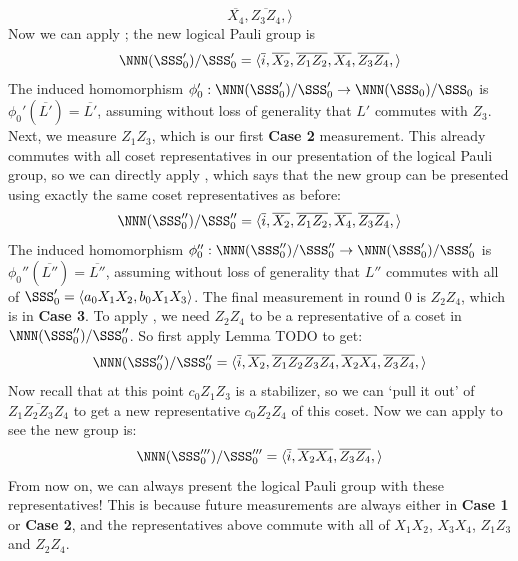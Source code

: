 \begin{example}
\begin{equation}
            \overline{X_4}, \overline{Z_3 Z_4},
        \rangle
    \end{equation}
    Now we can apply ; the new logical Pauli group is
    \begin{equation}
        \NNN(\SSS_{0}')/\SSS_{0}' = \langle
            \overline{i},
            \overline{X_2}, \overline{Z_1 Z_2},
            \overline{X_4}, \overline{Z_3 Z_4},
        \rangle
    \end{equation}
    The induced homomorphism $\phi_0': \NNN(\SSS_{0}')/\SSS_{0}' \to \NNN(\SSS_{0})/\SSS_{0}$ is $\phi_0'(\overline{L'}) = \overline{L'}$, assuming without loss of generality that $L'$ commutes with $Z_3$.
    Next, we measure $Z_1 Z_3$, which is our first \textbf{Case 2} measurement.
    This already commutes with all coset representatives in our presentation of the logical Pauli group, so we can directly apply , which says that the new group can be presented using exactly the same coset representatives as before:
    \begin{equation}
        \NNN(\SSS_{0}'')/\SSS_{0}'' = \langle
        \overline{i},
        \overline{X_2}, \overline{Z_1 Z_2},
        \overline{X_4}, \overline{Z_3 Z_4},
        \rangle
    \end{equation}
    The induced homomorphism $\phi_0'': \NNN(\SSS_{0}'')/\SSS_{0}'' \to \NNN(\SSS_{0}')/\SSS_{0}'$ is $\phi_0''(\overline{L''}) = \overline{L''}$, assuming without loss of generality that $L''$ commutes with all of $\SSS_{0}' = \langle a_0 X_1 X_2, b_0 X_1 X_3 \rangle$.
    The final measurement in round $0$ is $Z_2 Z_4$, which is in \textbf{Case 3}.
    To apply , we need $Z_2 Z_4$ to be a representative of a coset in $\NNN(\SSS_{0}'')/\SSS_{0}''$.
    So first apply Lemma TODO to get:
    \begin{equation}
        \NNN(\SSS_{0}'')/\SSS_{0}'' = \langle
        \overline{i},
        \overline{X_2}, \overline{Z_1 Z_2 Z_3 Z_4},
        \overline{X_2 X_4}, \overline{Z_3 Z_4},
        \rangle
    \end{equation}
    Now recall that at this point $c_0 Z_1 Z_3$ is a stabilizer, so we can `pull it out' of $\overline{Z_1 Z_2 Z_3 Z_4}$ to get a new representative $c_0 Z_2 Z_4$ of this coset.
    Now we can apply  to see the new group is:
    \begin{equation}
        \NNN(\SSS_{0}''')/\SSS_{0}''' = \langle
        \overline{i},
        \overline{X_2 X_4}, \overline{Z_3 Z_4},
        \rangle
    \end{equation}
    From now on, we can always present the logical Pauli group with these representatives!
    This is because future measurements are always either in \textbf{Case 1} or \textbf{Case 2}, and the representatives above commute with all of $X_1 X_2$, $X_3 X_4$, $Z_1 Z_3$ and $Z_2 Z_4$.
\end{example}

